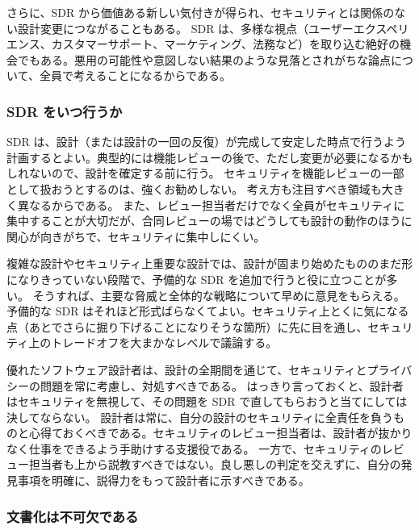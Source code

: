 \documentclass[uplatex]{jsarticle}
\def\label#1{}%
\begin{document}
さらに、SDR から価値ある新しい気付きが得られ、セキュリティとは関係のない設計変更につながることもある。
SDR は、多様な視点（ユーザーエクスペリエンス、カスタマーサポート、マーケティング、法務など）を取り込む絶好の機会でもある。悪用の可能性や意図しない結果のような見落とされがちな論点について、全員で考えることになるからである。

\subsubsection{SDR をいつ行うか}

SDR は、設計（または設計の一回の反復）が完成して安定した時点で行うよう計画するとよい。典型的には機能レビューの後で、ただし変更が必要になるかもしれないので、設計を確定する前に行う。
セキュリティを機能レビューの一部として扱おうとするのは、強くお勧めしない。
考え方も注目すべき領域も大きく異なるからである。
また、レビュー担当者だけでなく全員がセキュリティに集中することが大切だが、合同レビューの場ではどうしても設計の動作のほうに関心が向きがちで、セキュリティに集中しにくい。

複雑な設計やセキュリティ上重要な設計では、設計が固まり始めたもののまだ形になりきっていない段階で、予備的な SDR を追加で行うと役に立つことが多い。
そうすれば、主要な脅威と全体的な戦略について早めに意見をもらえる。
予備的な SDR はそれほど形式ばらなくてよい。セキュリティ上とくに気になる点（あとでさらに掘り下げることになりそうな箇所）に先に目を通し、セキュリティ上のトレードオフを大まかなレベルで議論する。

\begin{rem}[設計者とレビュー担当者の責任]\label{rem:ch7-designer-responsibility}
優れたソフトウェア設計者は、設計の全期間を通じて、セキュリティとプライバシーの問題を常に考慮し、対処すべきである。
はっきり言っておくと、設計者はセキュリティを無視して、その問題を SDR で直してもらおうと当てにしては決してならない。
設計者は常に、自分の設計のセキュリティに全責任を負うものと心得ておくべきである。セキュリティのレビュー担当者は、設計者が抜かりなく仕事をできるよう手助けする支援役である。
一方で、セキュリティのレビュー担当者も上から説教すべきではない。良し悪しの判定を交えずに、自分の発見事項を明確に、説得力をもって設計者に示すべきである。
\end{rem}

\subsubsection{文書化は不可欠である}
\end{document}
